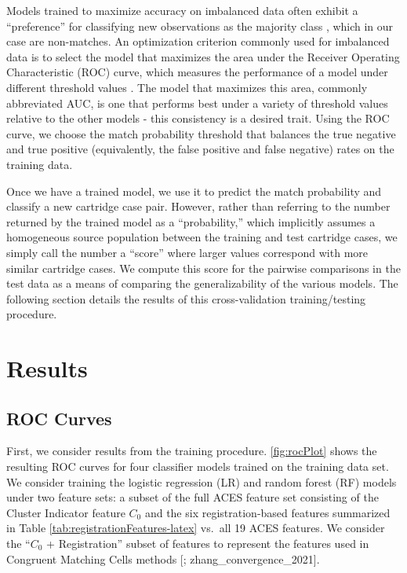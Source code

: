 \documentclass[11pt,]{isuthesis}
\begin{document}
Models trained to maximize accuracy on imbalanced data often exhibit a ``preference'' for classifying new observations as the majority class \citep{Fernndez2018}, which in our case are non-matches.
An optimization criterion commonly used for imbalanced data is to select the model that maximizes the area under the Receiver Operating Characteristic (ROC) curve, which measures the performance of a model under different threshold values \citep{James2013}.
The model that maximizes this area, commonly abbreviated AUC, is one that performs best under a variety of threshold values relative to the other models - this consistency is a desired trait.
Using the ROC curve, we choose the match probability threshold that balances the true negative and true positive (equivalently, the false positive and false negative) rates on the training data.

Once we have a trained model, we use it to predict the match probability and classify a new cartridge case pair.
However, rather than referring to the number returned by the trained model as a ``probability,'' which implicitly assumes a homogeneous source population between the training and test cartridge cases, we simply call the number a ``score'' where larger values correspond with more similar cartridge cases.
We compute this score for the pairwise comparisons in the test data as a means of comparing the generalizability of the various models.
The following section details the results of this cross-validation training/testing procedure.

\hypertarget{results}{%
\section{Results}\label{results}}

\hypertarget{roc-curves}{%
\subsection{ROC Curves}\label{roc-curves}}

First, we consider results from the training procedure.
\ref{fig:rocPlot} shows the resulting ROC curves for four classifier models trained on the training data set.
We consider training the logistic regression (LR) and random forest (RF) models under two feature sets: a subset of the full ACES feature set consisting of the Cluster Indicator feature \(C_0\) and the six registration-based features summarized in Table \ref{tab:registrationFeatures-latex} vs.~all 19 ACES features.
We consider the ``\(C_0\) + Registration'' subset of features to represent the features used in Congruent Matching Cells methods {[}\citet{song_proposed_2013}; zhang\_convergence\_2021{]}.
\end{document}
